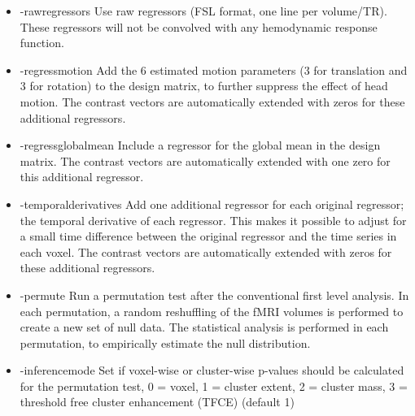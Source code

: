\begin{itemize}

\item -rawregressors
\newline \newline Use raw regressors (FSL format, one line per volume/TR). These regressors will not be convolved with any hemodynamic response function.

\item -regressmotion 
\newline \newline Add the 6 estimated motion parameters (3 for translation and 3 for rotation) to the design matrix, to further suppress the effect of head motion. The contrast vectors are automatically extended with zeros for these additional regressors. 

\newpage 

\item -regressglobalmean 
\newline \newline Include a regressor for the global mean in the design matrix. The contrast vectors are automatically extended with one zero for this additional regressor. 
 
\item -temporalderivatives 
\newline \newline Add one additional regressor for each original regressor; the temporal derivative of each regressor. This makes it possible to adjust for a small time difference between the original regressor and the time series in each voxel. The contrast vectors are automatically extended with zeros for these additional regressors.

\item -permute
\newline \newline Run a permutation test after the conventional first level analysis. In each permutation, a random reshuffling of the fMRI volumes is performed to create a new set of null data. The statistical analysis is performed in each permutation, to empirically estimate the null distribution. 

\item -inferencemode 
\newline \newline Set if voxel-wise or cluster-wise p-values should be calculated for the permutation test, 0 = voxel, 1 = cluster extent, 2 = cluster mass, 3 = threshold free cluster enhancement (TFCE) (default 1)


\end{itemize}
